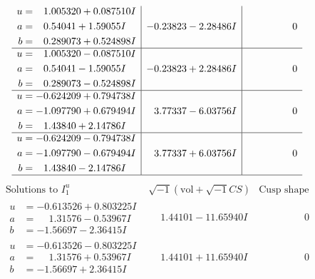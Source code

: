 \documentclass[1p]{elsarticle_modified}
\theoremstyle{definition}
\newcommand{\I}{\sqrt{-1}}
\begin{document}
$$\begin{array}{c|c|c}
\begin{aligned}
u &= \phantom{-}1.005320 + 0.087510 I \\
a &= \phantom{-}0.54041 + 1.59055 I \\
b &= \phantom{-}0.289073 + 0.524898 I\end{aligned}
 & -0.23823 - 2.28486 I & \phantom{-0.000000 } 0 \\ \hline\begin{aligned}
u &= \phantom{-}1.005320 - 0.087510 I \\
a &= \phantom{-}0.54041 - 1.59055 I \\
b &= \phantom{-}0.289073 - 0.524898 I\end{aligned}
 & -0.23823 + 2.28486 I & \phantom{-0.000000 } 0 \\ \hline\begin{aligned}
u &= -0.624209 + 0.794738 I \\
a &= -1.097790 + 0.679494 I \\
b &= \phantom{-}1.43840 + 2.14786 I\end{aligned}
 & \phantom{-}3.77337 - 6.03756 I & \phantom{-0.000000 } 0 \\ \hline\begin{aligned}
u &= -0.624209 - 0.794738 I \\
a &= -1.097790 - 0.679494 I \\
b &= \phantom{-}1.43840 - 2.14786 I\end{aligned}
 & \phantom{-}3.77337 + 6.03756 I & \phantom{-0.000000 } 0\\
 \hline 
 \end{array}$$\newpage$$\begin{array}{c|c|c}  
\text{Solutions to }I^u_{1}& \I (\text{vol} + \sqrt{-1}CS) & \text{Cusp shape}\\
 \hline 
\begin{aligned}
u &= -0.613526 + 0.803225 I \\
a &= \phantom{-}1.31576 - 0.53967 I \\
b &= -1.56697 - 2.36415 I\end{aligned}
 & \phantom{-}1.44101 - 11.65940 I & \phantom{-0.000000 } 0 \\ \hline\begin{aligned}
u &= -0.613526 - 0.803225 I \\
a &= \phantom{-}1.31576 + 0.53967 I \\
b &= -1.56697 + 2.36415 I\end{aligned}
 & \phantom{-}1.44101 + 11.65940 I & \phantom{-0.000000 } 0 \\ \hline\begin{aligned}

\end{aligned}
\end{array}$$
\end{document}
